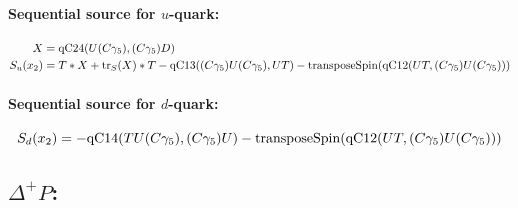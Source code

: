 \documentclass[12pt]{article}
\begin{document}
\paragraph{Sequential source for $u$-quark:}
\begin{gather*}
\begin{split}
X &= {\rm qC24}(U(C\gamma_5),(C\gamma_5)D) \\
S_u(x_2) &= T*X + {\rm tr}_S(X)*T
  - {\rm qC13}((C\gamma_5) U (C\gamma_5),U T)
  - {\rm transposeSpin}({\rm qC12}(U T, (C\gamma_5) U (C\gamma_5)))
\end{split}
\end{gather*}

\paragraph{Sequential source for $d$-quark:}
\[
S_d(x_2) = 
  - {\rm qC14}(T U(C\gamma_5),(C\gamma_5)U)
  - {\rm transposeSpin}({\rm qC12}(U T,(C\gamma_5)U (C\gamma_5)))
\]


\subsection{$\Delta^+ P$:}
\end{document}
